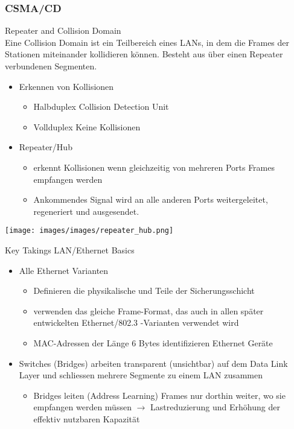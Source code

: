 \columnbreak

\subsubsection*{CSMA/CD}

\begin{concept}{Repeater and Collision Domain}\\
    Eine Collision Domain ist ein Teilbereich eines LANs, in dem die Frames der Stationen miteinander kollidieren können.
    Besteht aus über einen Repeater verbundenen Segmenten.
    \begin{itemize}
        \item Erkennen von Kollisionen
        \begin{itemize}
            \item Halbduplex Collision Detection Unit
            \item Vollduplex Keine Kollisionen
        \end{itemize}
        
        \item Repeater/Hub
        \begin{itemize}
            \item erkennt Kollisionen wenn gleichzeitig von mehreren Ports Frames empfangen werden
            \item Ankommendes Signal wird an alle anderen Ports weitergeleitet, regeneriert und ausgesendet. 
        \end{itemize}
    \end{itemize}
        \texttt{[image: images/images/repeater\_hub.png]}
\end{concept}



\begin{KR}{Key Takings LAN/Ethernet Basics}
    \begin{itemize}
        \item Alle Ethernet Varianten
        \begin{itemize}
            \item Definieren die physikalische und Teile der Sicherungsschicht
            \item verwenden das gleiche Frame-Format, das auch in allen später entwickelten Ethernet/802.3 -Varianten verwendet wird
            \item MAC-Adressen der Länge 6 Bytes identifizieren Ethernet Geräte
        \end{itemize}
        \item Switches (Bridges) arbeiten transparent (unsichtbar) auf dem Data Link Layer und schliessen mehrere Segmente zu einem LAN zusammen
        \begin{itemize}
            \item Bridges leiten (Address Learning) Frames nur dorthin weiter, wo sie empfangen werden müssen $\longrightarrow$ Lastreduzierung und Erhöhung der effektiv nutzbaren Kapazität
        \end{itemize}
    \end{itemize}
\end{KR}

